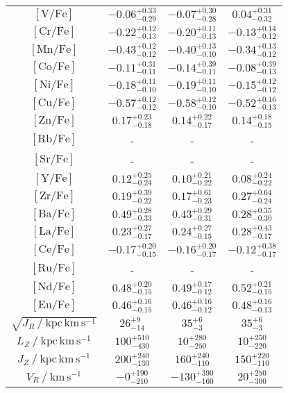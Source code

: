 \begin{table}
\begin{tabular}{cccc}
$\mathrm{[V/Fe]}$ & $-0.06_{-0.29}^{+0.33}$ & $-0.07_{-0.28}^{+0.30}$ & $0.04_{-0.32}^{+0.31}$ \\
$\mathrm{[Cr/Fe]}$ & $-0.22_{-0.13}^{+0.12}$ & $-0.20_{-0.13}^{+0.11}$ & $-0.13_{-0.12}^{+0.14}$ \\
$\mathrm{[Mn/Fe]}$ & $-0.43_{-0.12}^{+0.12}$ & $-0.40_{-0.10}^{+0.13}$ & $-0.34_{-0.12}^{+0.13}$ \\
$\mathrm{[Co/Fe]}$ & $-0.11_{-0.11}^{+0.31}$ & $-0.14_{-0.11}^{+0.39}$ & $-0.08_{-0.13}^{+0.39}$ \\
$\mathrm{[Ni/Fe]}$ & $-0.18_{-0.10}^{+0.11}$ & $-0.19_{-0.10}^{+0.11}$ & $-0.15_{-0.12}^{+0.12}$ \\
$\mathrm{[Cu/Fe]}$ & $-0.57_{-0.12}^{+0.12}$ & $-0.58_{-0.10}^{+0.12}$ & $-0.52_{-0.13}^{+0.16}$ \\
$\mathrm{[Zn/Fe]}$ & $0.17_{-0.18}^{+0.23}$ & $0.14_{-0.17}^{+0.22}$ & $0.14_{-0.15}^{+0.18}$ \\
$\mathrm{[Rb/Fe]}$ & - & - & - \\
$\mathrm{[Sr/Fe]}$ & - & - & - \\
$\mathrm{[Y/Fe]}$ & $0.12_{-0.24}^{+0.25}$ & $0.10_{-0.22}^{+0.21}$ & $0.08_{-0.22}^{+0.24}$ \\
$\mathrm{[Zr/Fe]}$ & $0.19_{-0.22}^{+0.39}$ & $0.17_{-0.23}^{+0.61}$ & $0.27_{-0.24}^{+0.64}$ \\
$\mathrm{[Ba/Fe]}$ & $0.49_{-0.33}^{+0.28}$ & $0.43_{-0.31}^{+0.29}$ & $0.28_{-0.30}^{+0.35}$ \\
$\mathrm{[La/Fe]}$ & $0.23_{-0.17}^{+0.27}$ & $0.24_{-0.15}^{+0.27}$ & $0.28_{-0.17}^{+0.43}$ \\
$\mathrm{[Ce/Fe]}$ & $-0.17_{-0.15}^{+0.20}$ & $-0.16_{-0.17}^{+0.20}$ & $-0.12_{-0.17}^{+0.38}$ \\
$\mathrm{[Ru/Fe]}$ & - & - & - \\
$\mathrm{[Nd/Fe]}$ & $0.48_{-0.15}^{+0.20}$ & $0.49_{-0.12}^{+0.17}$ & $0.52_{-0.15}^{+0.21}$ \\
$\mathrm{[Eu/Fe]}$ & $0.46_{-0.15}^{+0.16}$ & $0.46_{-0.12}^{+0.16}$ & $0.48_{-0.13}^{+0.16}$ \\
\hline
$\sqrt{J_R~/~\mathrm{kpc\,km\,s^{-1}}}$ & $26_{-14}^{+9}$ & $35_{-3}^{+6}$ & $35_{-3}^{+6}$ \\
$L_Z~/~\mathrm{kpc\,km\,s^{-1}}$ & $100_{-430}^{+510}$ & $10_{-250}^{+280}$ & $10_{-220}^{+250}$ \\
$J_Z~/~\mathrm{kpc\,km\,s^{-1}}$ & $200_{-130}^{+240}$ & $160_{-110}^{+240}$ & $150_{-110}^{+220}$ \\
$V_R~/~\mathrm{km\,s^{-1}}$ & $-0_{-210}^{+190}$ & $-130_{-160}^{+390}$ & $20_{-300}^{+250}$ \\

\end{tabular}
\end{table}
